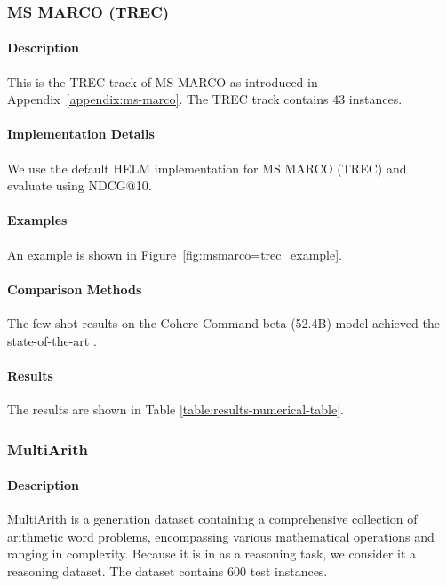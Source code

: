 \subsubsection{MS MARCO (TREC)}

\paragraph{Description} 
This is the TREC track of MS MARCO \citep{bajaj2018ms, nogueira2020document, MacAvaney_2021} as introduced in Appendix~\ref{appendix:ms-marco}.
The TREC track contains 43 instances.

\paragraph{Implementation Details}
We use the default HELM implementation for MS MARCO (TREC) and evaluate using NDCG@10.  

\paragraph{Examples} An example is shown in Figure~\ref{fig:msmarco=trec_example}.

\paragraph{Comparison Methods}
The few-shot results on the Cohere Command beta (52.4B) model achieved the state-of-the-art \citep{liang2022holistic}.

\paragraph{Results} The results are shown in Table \ref{table:results-numerical-table}.

\subsubsection{MultiArith}
\paragraph{Description} MultiArith \citep{roy2016solving} is a generation dataset containing a comprehensive collection of arithmetic word problems, encompassing various mathematical operations and ranging in complexity. Because it is in \citet{kojima2023large} as a reasoning task, we consider it a reasoning dataset. The dataset contains 600 test instances.

